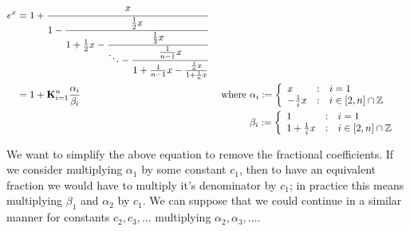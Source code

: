 \begin{align}
e^x &= 1 + \cfrac{x}{1 -
		   \cfrac{\frac{1}{2}x}{1 + \frac{1}{2}x - 
		   \cfrac{\frac{1}{3}x}{\ddots - 
		   \cfrac{\frac{1}{n-1}x}{1 + \frac{1}{n-1}x - 
		   \frac{\frac{1}{n}x}{1 + \frac{1}{n}x} } } } }
		   \label{EQN_"exp cont frac 1"}\\
	&= 1 + \mathbf{K}_{i=1}^n\frac{\alpha_i}{\beta_i} &\textrm{ where }
		&\alpha_i := \left\{\begin{array}{lcl}
			x&:&i=1\\
			-\frac{1}{i}x &:& i \in [2, n]\cap\mathbb{Z}
			\end{array}\right.\nonumber\\
	&	&&\beta_i := \left\{\begin{array}{lcl}
			1 &:& i=1\\
			1 + \frac{1}{i}x &:& i \in [2,n]\cap\mathbb{Z}
			\end{array}\right.\nonumber
\end{align}

We want to simplify the above equation to remove the fractional coefficients. If we consider multiplying \(\alpha_1\) by some constant \(c_1\), then to have an equivalent fraction we would have to multiply it's denominator by \(c_1\); in practice this means multiplying \(\beta_1\) and \(\alpha_2\) by \(c_1\). We can suppose that we could continue in a similar manner for constants \(c_2, c_3, \ldots\) multiplying \(\alpha_2, \alpha_3, \ldots\).

